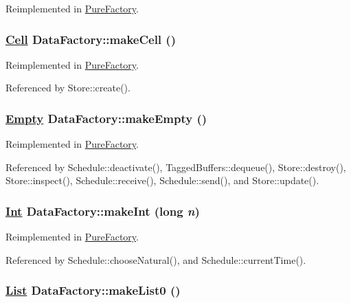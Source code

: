 Reimplemented in \hyperlink{classPureFactory_a3}{Pure\-Factory}.\hypertarget{interfaceDataFactory_a12}{
\subsubsection[makeCell]{\setlength{\rightskip}{0pt plus 5cm}\hyperlink{interfaceCell}{Cell} Data\-Factory::make\-Cell ()}}
\label{interfaceDataFactory_a12}




Reimplemented in \hyperlink{classPureFactory_a10}{Pure\-Factory}.

Referenced by Store::create().

\hypertarget{interfaceDataFactory_a0}{
\subsubsection[makeEmpty]{\setlength{\rightskip}{0pt plus 5cm}\hyperlink{interfaceEmpty}{Empty} Data\-Factory::make\-Empty ()}}
\label{interfaceDataFactory_a0}




Reimplemented in \hyperlink{classPureFactory_a11}{Pure\-Factory}.

Referenced by Schedule::deactivate(), Tagged\-Buffers::dequeue(), Store::destroy(), Store::inspect(), Schedule::receive(), Schedule::send(), and Store::update().

\hypertarget{interfaceDataFactory_a2}{
\subsubsection[makeInt]{\setlength{\rightskip}{0pt plus 5cm}\hyperlink{interfaceInt}{Int} Data\-Factory::make\-Int (long {\em n})}}
\label{interfaceDataFactory_a2}




Reimplemented in \hyperlink{classPureFactory_a1}{Pure\-Factory}.

Referenced by Schedule::choose\-Natural(), and Schedule::current\-Time().

\hypertarget{interfaceDataFactory_a7}{
\subsubsection[makeList0]{\setlength{\rightskip}{0pt plus 5cm}\hyperlink{interfaceList}{List} Data\-Factory::make\-List0 ()}}
\label{interfaceDataFactory_a7}




